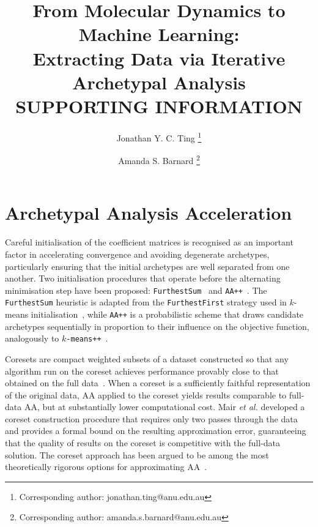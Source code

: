 \documentclass[12pt]{article}
\begin{document}
\title{ From Molecular Dynamics to Machine Learning:\\ Extracting Data via Iterative Archetypal Analysis  \linebreak  SUPPORTING INFORMATION }
\author[1]{Jonathan Y. C. Ting \footnote{Corresponding author: jonathan.ting@anu.edu.au}}
\author[1]{Amanda S. Barnard \footnote{Corresponding author: amanda.s.barnard@anu.edu.au}}
\date{}
\setcounter{Maxaffil}{0}
\renewcommand\Affilfont{\itshape\small}

\maketitle



\section{Archetypal Analysis Acceleration}
\label{sec:SIAAaccelerate}


Careful initialisation of the coefficient matrices is recognised as an important factor in accelerating convergence and avoiding degenerate archetypes, particularly ensuring that the initial archetypes are well separated from one another. Two initialisation procedures that operate before the alternating minimisation step have been proposed: \texttt{FurthestSum}~\cite{Morup2012kernelAA} and \texttt{AA++}~\cite{Mair2023AA++}. The \texttt{FurthestSum} heuristic is adapted from the \texttt{FurthestFirst} strategy used in $k$-means initialisation~\cite{Hochbaum1985FurtherFirst}, while \texttt{AA++} is a probabilistic scheme that draws candidate archetypes sequentially in proportion to their influence on the objective function, analogously to \texttt{$k$-means++}~\cite{Mair2023AA++}.

Coresets are compact weighted subsets of a dataset constructed so that any algorithm run on the coreset achieves performance provably close to that obtained on the full data~\cite{Feldman2020coresets}. When a coreset is a sufficiently faithful representation of the original data, AA applied to the coreset yields results comparable to full-data AA, but at substantially lower computational cost. Mair \textit{et al.} developed a coreset construction procedure that requires only two passes through the data~\cite{Mair2019Coresets} and provides a formal bound on the resulting approximation error, guaranteeing that the quality of results on the coreset is competitive with the full-data solution. The coreset approach has been argued to be among the most theoretically rigorous options for approximating AA~\cite{Mair2019Coresets}.
\end{document}
